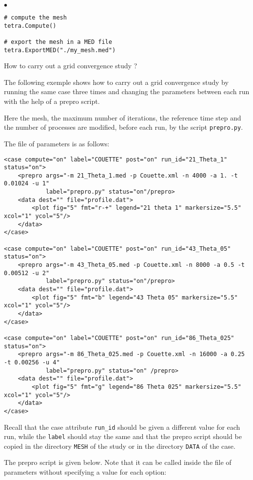 \documentclass[a4paper,10pt,twoside]{csshortdoc}
\begin{document}
\begin{list}{$\bullet$}{}
\begin{verbatim}
# compute the mesh
tetra.Compute()

# export the mesh in a MED file
tetra.ExportMED("./my_mesh.med")
\end{verbatim}
\normalsize

\item How to carry out a grid convergence study ?

The following exemple shows how to carry out a grid convergence study by running
the same case three times and changing the parameters between each run with the
help of a prepro script.

Here the mesh, the maximum number of iterations, the reference time step and the
number of processes are modified, before each run, by the script
\texttt{prepro.py}.

The file of parameters is as follows:

\small
\begin{verbatim}
<case compute="on" label="COUETTE" post="on" run_id="21_Theta_1" status="on">
    <prepro args="-m 21_Theta_1.med -p Couette.xml -n 4000 -a 1. -t 0.01024 -u 1"
            label="prepro.py" status="on"/prepro>
    <data dest="" file="profile.dat">
        <plot fig="5" fmt="r-+" legend="21 theta 1" markersize="5.5" xcol="1" ycol="5"/>
    </data>
</case>

<case compute="on" label="COUETTE" post="on" run_id="43_Theta_05" status="on">
    <prepro args="-m 43_Theta_05.med -p Couette.xml -n 8000 -a 0.5 -t 0.00512 -u 2"
            label="prepro.py" status="on"/prepro>
    <data dest="" file="profile.dat">
        <plot fig="5" fmt="b" legend="43 Theta 05" markersize="5.5" xcol="1" ycol="5"/>
    </data>
</case>

<case compute="on" label="COUETTE" post="on" run_id="86_Theta_025" status="on">
    <prepro args="-m 86_Theta_025.med -p Couette.xml -n 16000 -a 0.25 -t 0.00256 -u 4"
            label="prepro.py" status="on" /prepro>
    <data dest="" file="profile.dat">
        <plot fig="5" fmt="g" legend="86 Theta 025" markersize="5.5" xcol="1" ycol="5"/>
    </data>
</case>
\end{verbatim}
\normalsize

Recall that the case attribute \texttt{run\_id} should be given a different
value for each run, while the \texttt{label} should stay the same and that the
prepro script should be copied in the directory \texttt{MESH} of the study or in
the directory \texttt{DATA} of the case.

The prepro script is given below. Note that it can be called inside the file of
parameters without specifying a value for each option:


\end{list}
\end{document}
